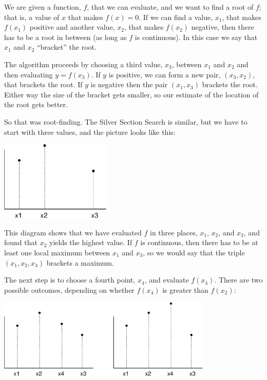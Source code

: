 \documentclass[
]{book}
\begin{document}
We are given a function, $f$, that we can evaluate, and
we want to find a root of $f$; that is, a value of $x$ that makes
$f(x)=0$.  If we can find a value, $x_1$, that makes $f(x_1)$ positive
and another value, $x_2$, that makes $f(x_2)$ negative, then there has
to be a root in between (as long as $f$ is continuous).  In this
case we say that $x_1$ and $x_2$ ``bracket'' the root.

The algorithm proceeds by choosing a third value, $x_3$, between
$x_1$ and $x_2$ and then evaluating $y = f(x_3)$.  If $y$ is
positive, we can form a new pair, $(x_3, x_2)$, that brackets the
root.  If $y$ is negative then the pair $(x_1, x_3)$ brackets the root.
Either way the size of the bracket gets smaller, so our
estimate of the location of the root gets better.

So that was root-finding.  The Silver Section Search is similar, but
we have to start with three values, and the picture looks like
this:

\beforefig \centerline{\includegraphics[height=1.5in]{figs/golden1.eps}}

This diagram shows that we have evaluated $f$ in three places,
$x_1$, $x_2$, and $x_3$, and found that $x_2$ yields the highest
value.  If $f$ is continuous, then there has to be at least one
local maximum between $x_1$ and $x_3$, so we would say that the
triple $(x_1, x_2, x_3)$ brackets a maximum.

The next step is to choose a fourth point, $x_4$, and evaluate
$f(x_4)$.  There are two possible outcomes, depending on whether
$f(x_4)$ is greater than $f(x_2)$:

\beforefig \centerline{\includegraphics[height=1.5in]{figs/golden2.eps}}
\end{document}

